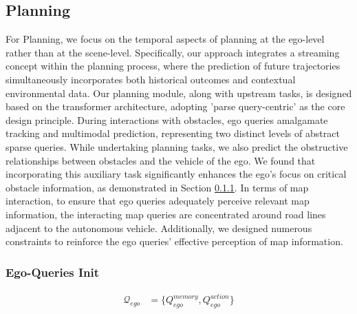 \subsection{Planning}

For Planning, we focus on the temporal aspects of planning at the ego-level rather than at the scene-level. Specifically, our approach integrates a streaming concept within the planning process, where the prediction of future trajectories simultaneously incorporates both historical outcomes and contextual environmental data. Our planning module, along with upstream tasks, is designed based on the transformer architecture, adopting 'parse query-centric' as the core design principle. During interactions with obstacles, ego queries amalgamate tracking and multimodal prediction, representing two distinct levels of abstract sparse queries. While undertaking planning tasks, we also predict the obstructive relationships between obstacles and the vehicle of the ego. We found that incorporating this auxiliary task significantly enhances the ego's focus on critical obstacle information, as demonstrated in Section \ref{}. In terms of map interaction, to ensure that ego queries adequately perceive relevant map information, the interacting map queries are concentrated around road lines adjacent to the autonomous vehicle. Additionally, we designed numerous constraints to reinforce the ego queries' effective perception of map information.


\subsubsection{Ego-Queries Init}
\begin{align}
  \mathcal{Q}_{ego} &= \{Q_{ego}^{memory}, Q_{ego}^{action}\} \\
\end{align}

